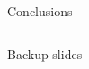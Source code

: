 \documentclass[10pt,aspectratio=169,usenames,dvipsnames]{beamer}
\begin{document}
\begin{frame}{Conclusions}
\begin{columns}[T]
\begin{column}{0.1\textwidth}
        \end{column}
    \end{columns}
\end{frame}

\begin{frame}

\end{frame}

\appendix
\begin{frame}[standout]
	Backup slides
\end{frame}
\end{document}
